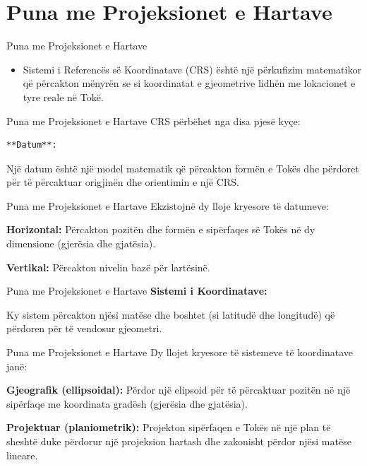 \documentclass[
  ignorenonframetext,
]{beamer}
\providecommand{\tightlist}{%
  \setlength{\itemsep}{0pt}\setlength{\parskip}{0pt}}
\begin{document}
\hypertarget{puna-me-projeksionet-e-hartave}{%
\section{Puna me Projeksionet e
Hartave}\label{puna-me-projeksionet-e-hartave}}

\begin{frame}{Puna me Projeksionet e Hartave}
\protect\hypertarget{puna-me-projeksionet-e-hartave-1}{}
\begin{itemize}
\tightlist
\item
  Sistemi i Referencës së Koordinatave (CRS) është një përkufizim
  matematikor që përcakton mënyrën se si koordinatat e gjeometrive
  lidhën me lokacionet e tyre reale në Tokë.
\end{itemize}
\end{frame}

\begin{frame}[fragile]{Puna me Projeksionet e Hartave}
\protect\hypertarget{puna-me-projeksionet-e-hartave-2}{}
CRS përbëhet nga disa pjesë kyçe:

\begin{verbatim}
**Datum**:
\end{verbatim}

Një datum është një model matematik që përcakton formën e Tokës dhe
përdoret për të përcaktuar origjinën dhe orientimin e një CRS.
\end{frame}

\begin{frame}{Puna me Projeksionet e Hartave}
\protect\hypertarget{puna-me-projeksionet-e-hartave-3}{}
Ekzistojnë dy lloje kryesore të datumeve:

\textbf{Horizontal:} Përcakton pozitën dhe formën e sipërfaqes së Tokës
në dy dimensione (gjerësia dhe gjatësia).

\textbf{Vertikal:} Përcakton nivelin bazë për lartësinë.
\end{frame}

\begin{frame}{Puna me Projeksionet e Hartave}
\protect\hypertarget{puna-me-projeksionet-e-hartave-4}{}
\textbf{Sistemi i Koordinatave:}

Ky sistem përcakton njësi matëse dhe boshtet (si latitudë dhe longitudë)
që përdoren për të vendosur gjeometri.
\end{frame}

\begin{frame}{Puna me Projeksionet e Hartave}
\protect\hypertarget{puna-me-projeksionet-e-hartave-5}{}
Dy llojet kryesore të sistemeve të koordinatave janë:

\textbf{Gjeografik (ellipsoidal):} Përdor një elipsoid për të përcaktuar
pozitën në një sipërfaqe me koordinata gradësh (gjerësia dhe gjatësia).

\textbf{Projektuar (planiometrik):} Projekton sipërfaqen e Tokës në një
plan të sheshtë duke përdorur një projeksion hartash dhe zakonisht
përdor njësi matëse lineare.
\end{frame}
\end{document}
